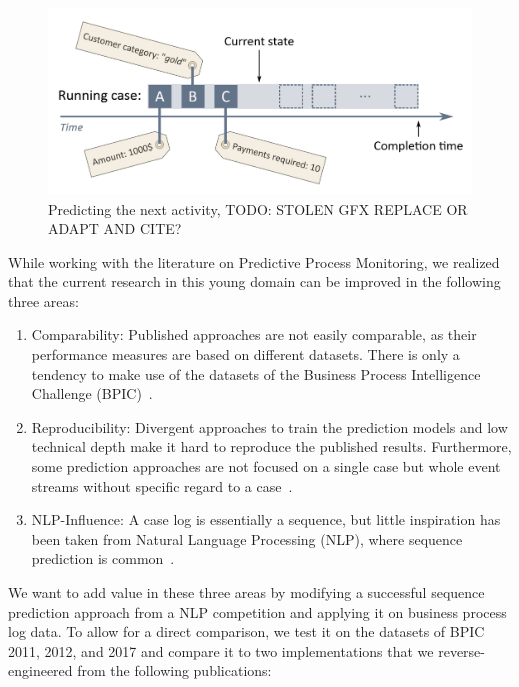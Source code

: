 \begin{figure}
    \centering
    \includegraphics[width=\textwidth]{gfx/next-activity.png}
    \caption{Predicting the next activity, TODO: STOLEN GFX REPLACE OR ADAPT AND CITE?}
    \label{fig:next-activity-prediction}
\end{figure}

While working with the literature on Predictive Process Monitoring, we realized that the current research in this young domain can be improved in the following three areas:

\begin{enumerate}
    \item Comparability: Published approaches are not easily comparable, as their performance measures are based on different datasets. There is only a tendency to make use of the datasets of the Business Process Intelligence Challenge (BPIC)~\cite{BPIC2011, BPIC2012, BPIC2017}.
    \item Reproducibility: Divergent approaches to train the prediction models and low technical depth make it hard to reproduce the published results. Furthermore, some prediction approaches are not focused on a single case but whole event streams without specific regard to a case~\cite{evermann2016, schoenig2018}.
    \item NLP-Influence: A case log is essentially a sequence, but little inspiration has been taken from Natural Language Processing (NLP), where sequence prediction is common~\cite{shibata2016bipartite}.
\end{enumerate}

We want to add value in these three areas by modifying a successful sequence prediction approach from a NLP competition and applying it on business process log data. To allow for a direct comparison, we test it on the datasets of BPIC 2011, 2012, and 2017 and compare it to two implementations that we reverse-engineered from the following publications:


